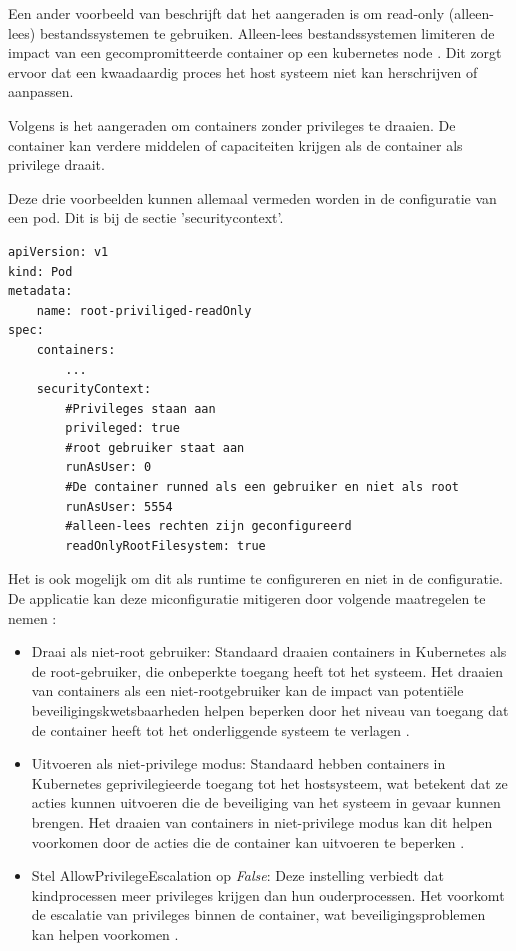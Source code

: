 Een ander voorbeeld van \textcite{OWASP-2023} beschrijft dat het aangeraden is om read-only (alleen-lees) bestandssystemen te gebruiken. Alleen-lees bestandssystemen limiteren de impact van een gecompromitteerde container op een kubernetes node \autocite{OWASP-2023}. Dit zorgt ervoor dat een kwaadaardig proces het host systeem niet kan herschrijven of aanpassen.

Volgens \textcite{OWASP-2023} is het aangeraden om containers zonder privileges te draaien. De container kan verdere middelen of capaciteiten krijgen als de container als privilege draait. 

Deze drie voorbeelden kunnen allemaal vermeden worden in de configuratie van een pod. Dit is bij de sectie 'securitycontext'. 
\begin{verbatim}
apiVersion: v1  
kind: Pod  
metadata:  
    name: root-priviliged-readOnly
spec:  
    containers:  
        ...
    securityContext:  
        #Privileges staan aan 
        privileged: true
        #root gebruiker staat aan
        runAsUser: 0
        #De container runned als een gebruiker en niet als root
        runAsUser: 5554
        #alleen-lees rechten zijn geconfigureerd
        readOnlyRootFilesystem: true
\end{verbatim}

Het is ook mogelijk om dit als runtime te configureren en niet in de configuratie. De applicatie kan deze miconfiguratie mitigeren door volgende maatregelen te nemen \autocite{OWASP-2023}:
\begin{itemize}
    \item Draai als niet-root gebruiker: Standaard draaien containers in Kubernetes als de root-gebruiker, die onbeperkte toegang heeft tot het systeem. Het draaien van containers als een niet-rootgebruiker kan de impact van potentiële beveiligingskwetsbaarheden helpen beperken door het niveau van toegang dat de container heeft tot het onderliggende systeem te verlagen \autocite{OWASP-2023}.
    \item Uitvoeren als niet-privilege modus: Standaard hebben containers in Kubernetes geprivilegieerde toegang tot het hostsysteem, wat betekent dat ze acties kunnen uitvoeren die de beveiliging van het systeem in gevaar kunnen brengen. Het draaien van containers in niet-privilege modus kan dit helpen voorkomen door de acties die de container kan uitvoeren te beperken \autocite{OWASP-2023}.
    \item Stel AllowPrivilegeEscalation op \textit{False}: Deze instelling verbiedt dat kindprocessen meer privileges krijgen dan hun ouderprocessen. Het voorkomt de escalatie van privileges binnen de container, wat beveiligingsproblemen kan helpen voorkomen \autocite{OWASP-2023}.
\end{itemize}

